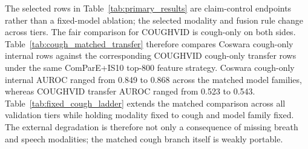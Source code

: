 \documentclass[journal]{IEEEtran}
\begin{document}
The selected rows in Table~\ref{tab:primary_results} are claim-control endpoints rather than a fixed-model ablation; the selected modality and fusion rule change across tiers. The fair comparison for COUGHVID is cough-only on both sides. Table~\ref{tab:cough_matched_transfer} therefore compares Coswara cough-only internal rows against the corresponding COUGHVID cough-only transfer rows under the same ComParE+IS10 top-800 feature strategy. Coswara cough-only internal AUROC ranged from 0.849 to 0.868 across the matched model families, whereas COUGHVID transfer AUROC ranged from 0.523 to 0.543. Table~\ref{tab:fixed_cough_ladder} extends the matched comparison across all validation tiers while holding modality fixed to cough and model family fixed. The external degradation is therefore not only a consequence of missing breath and speech modalities; the matched cough branch itself is weakly portable.

\begin{table}[t]
\caption{Selected audio endpoints across the validation ladder. Values are rounded to three decimals and are interpreted by protocol, not as a single pooled leaderboard. Coswara rows can involve multimodal fusion; the COUGHVID row is cough-only external transfer.}
\label{tab:primary_results}
\centering
\scriptsize
{}
\end{table}
\end{document}
